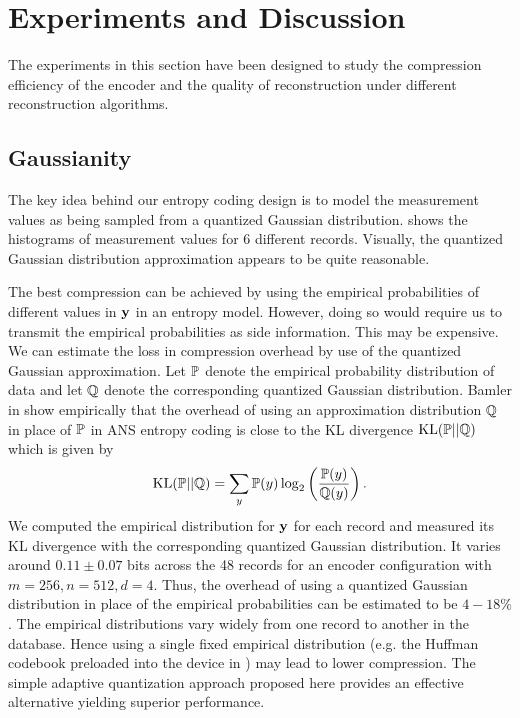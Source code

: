\section{Experiments and Discussion}
\label{sec:results}
The experiments in this section have been
designed to study the compression efficiency
of the encoder and the quality of reconstruction
under different reconstruction algorithms.


\subsection{Gaussianity}

The key idea behind our entropy coding
design is to model the measurement values as
being sampled from a quantized Gaussian distribution.
 shows the histograms of measurement
values for 6 different records.
Visually, the quantized Gaussian distribution approximation
appears to be quite reasonable.

The best compression can be achieved by using the empirical
probabilities of different values in $\mathbf{y}$ in an entropy model.
However, doing so would require us to transmit the empirical
probabilities as side information. This may be expensive.
We can estimate the loss in compression overhead
by use of the quantized Gaussian approximation.
Let $\mathbb{P}$ denote the empirical probability distribution
of data and let $\mathbb{Q}$ denote the corresponding
quantized Gaussian distribution. Bamler in \cite{bamler2022constriction}
show empirically that the overhead of using an approximation
distribution $\mathbb{Q}$ in place of $\mathbb{P}$ in ANS entropy coding
is close to the KL divergence $\text{KL}(\mathbb{P} || \mathbb{Q})$
which is given by
\begin{equation}
\text{KL}(\mathbb{P} || \mathbb{Q}) = \sum_y \mathbb{P}(y) \log_2\left (\frac{\mathbb{P}(y)}{\mathbb{Q}(y)} \right).
\end{equation}
We computed the empirical distribution for $\mathbf{y}$ for each
record and measured its KL divergence with the corresponding
quantized Gaussian distribution.
It varies around $0.11 \pm 0.07$ bits across the 48 records
for an encoder configuration with $m=256,n=512,d=4$.
Thus, the overhead of using a quantized
Gaussian distribution in place of the empirical probabilities
can be estimated to be $4-18\%$.
The empirical distributions vary widely from one record to another
in the database. Hence using a single fixed empirical distribution
(e.g. the Huffman codebook preloaded into the device in
\cite{mamaghanian2011compressed})
may lead to lower compression.
The simple adaptive quantization approach proposed here
provides an effective alternative yielding superior performance.


